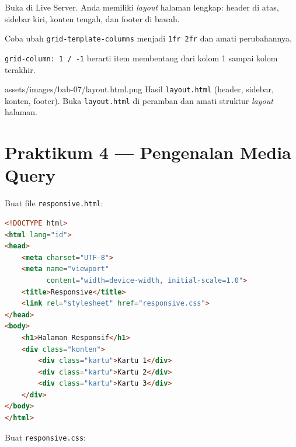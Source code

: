 \begin{langkah}
  \item Buka di Live Server. Anda memiliki \emph{layout} halaman lengkap: header di atas, sidebar kiri, konten tengah, dan footer di bawah.
  \item Coba ubah \texttt{grid-template-columns} menjadi \texttt{1fr 2fr} dan amati perubahannya.
\end{langkah}

\begin{catatan}
\texttt{grid-column: 1 / -1} berarti item membentang dari kolom 1 sampai kolom terakhir.
\end{catatan}

\begin{tangkapanlayar}
  {assets/images/bab-07/layout.html.png}
  {Hasil \texttt{layout.html} (header, sidebar, konten, footer).}
  {Buka \texttt{layout.html} di peramban dan amati struktur \emph{layout} halaman.}
\end{tangkapanlayar}

\section{Praktikum 4 --- Pengenalan Media Query}
\label{sec:grid-praktik-4}

\begin{langkah}
  \item Buat file \texttt{responsive.html}:
\end{langkah}

\begin{lstlisting}[language=HTML, caption={Struktur responsive.html}, label={lst:responsive-html}]
<!DOCTYPE html>
<html lang="id">
<head>
    <meta charset="UTF-8">
    <meta name="viewport"
          content="width=device-width, initial-scale=1.0">
    <title>Responsive</title>
    <link rel="stylesheet" href="responsive.css">
</head>
<body>
    <h1>Halaman Responsif</h1>
    <div class="konten">
        <div class="kartu">Kartu 1</div>
        <div class="kartu">Kartu 2</div>
        <div class="kartu">Kartu 3</div>
    </div>
</body>
</html>
\end{lstlisting}

\begin{langkah}
  \item Buat \texttt{responsive.css}:
\end{langkah}

